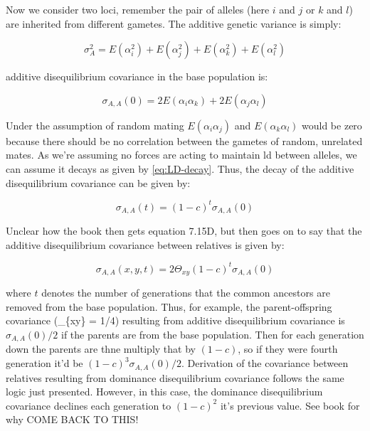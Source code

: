 \documentclass[
]{book}
\begin{document}
Now we consider two loci, remember the pair of alleles (here \(i\) and \(j\) or \(k\) and \(l\)) are inherited from different gametes. The additive genetic variance is simply:

\begin{equation}
    \sigma^2_{A} = E(\alpha^2_i) + E(\alpha^2_j) + E(\alpha^2_k) + E(\alpha^2_l)
    \label{eq:additive-genetic-variance-as-expectations}
\end{equation}

additive disequilibrium covariance in the base population is:

\begin{equation}
    \sigma_{A,A}(0) = 2E(\alpha_i\alpha_k) + 2E(\alpha_j\alpha_l)
    \label{eq:additive-disequilibrium-covariance-as-expectations}
\end{equation}

Under the assumption of random mating \(E(\alpha_i\alpha_j)\) and \(E(\alpha_k\alpha_l)\) would be zero because there should be no correlation between the gametes of random, unrelated mates. As we're assuming no forces are acting to maintain ld between alleles, we can assume it decays as given by \eqref{eq:LD-decay}. Thus, the decay of the additive disequilibrium covariance can be given by:

\begin{equation}
  \sigma_{A,A}(t) = (1 - c)^{t}\sigma_{A,A}(0)
  \label{eq:additive-disequilibrium-covariance-decay}
\end{equation}

Unclear how the book then gets equation 7.15D, but then goes on to say that the additive disequilibrium covariance between relatives is given by:

\begin{equation}
  \sigma_{A,A}(x, y, t) = 2\Theta_{xy}(1 - c)^{t}\sigma_{A,A}(0)
  \label{eq:additive-disequilibrium-covariance-between-relatives}
\end{equation}

where \(t\) denotes the number of generations that the common ancestors are removed from the base population. Thus, for example, the parent-offspring covariance (\Theta\_\{xy\} = 1/4) resulting from additive disequilibrium covariance is \(\sigma_{A,A}(0)/2\) if the parents are from the base population. Then for each generation down the parents are thne multiply that by \((1 - c)\), so if they were fourth generation it'd be \((1-c)^3\sigma_{A,A}(0)/2\). Derivation of the covariance between relatives resulting from dominance disequilibrium covariance follows the same logic just presented. However, in this case, the dominance disequilibrium covariance declines each generation to \((1 - c)^2\) it's previous value. See book for why COME BACK TO THIS!
\end{document}
